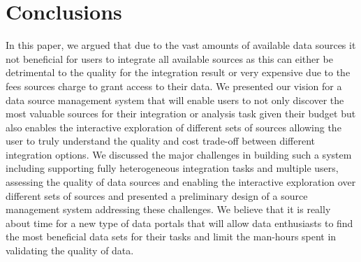 \documentclass{sig-alternate}
\begin{document}
\section{Conclusions}
\label{sec:conclusion}
In this paper, we argued that due to the vast amounts of available data sources it not beneficial for users to integrate all available sources as this can either be detrimental to the quality for the integration result or very expensive due to the fees sources charge to grant access to their data. We presented our vision for a data source management system that will enable users to not only discover the most valuable sources for their integration or analysis task given their budget but also enables the interactive exploration of different sets of sources allowing the user to truly understand the quality and cost trade-off between different integration options. We discussed the major challenges in building such a system including supporting fully heterogeneous integration tasks and multiple users, assessing the quality of data sources and enabling the interactive exploration over different sets of sources and presented a preliminary design of a source management system addressing these challenges. We believe that it is really about time for a new type of data portals that will allow data enthusiasts to find the most beneficial data sets for their tasks and limit the man-hours spent in validating the quality of data. 
{\small

}
\end{document}
